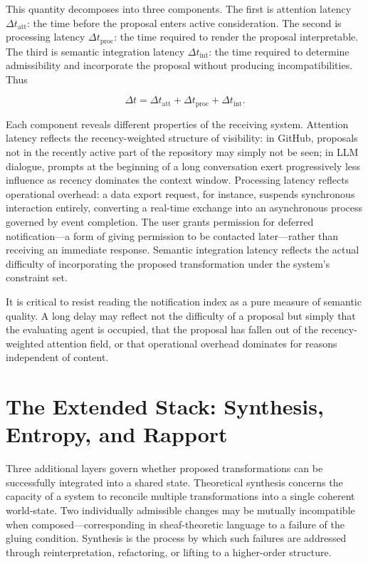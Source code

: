 \documentclass[12pt, letterpaper]{article}
\theoremstyle{flyxion}
\begin{document}
This quantity decomposes into three components. The first is attention latency $\Delta t_\mathrm{att}$: the time before the proposal enters active consideration. The second is processing latency $\Delta t_\mathrm{proc}$: the time required to render the proposal interpretable. The third is semantic integration latency $\Delta t_\mathrm{int}$: the time required to determine admissibility and incorporate the proposal without producing incompatibilities. Thus

\begin{equation}
\Delta t = \Delta t_\mathrm{att} + \Delta t_\mathrm{proc} + \Delta t_\mathrm{int}.
\end{equation}

Each component reveals different properties of the receiving system. Attention latency reflects the recency-weighted structure of visibility: in GitHub, proposals not in the recently active part of the repository may simply not be seen; in LLM dialogue, prompts at the beginning of a long conversation exert progressively less influence as recency dominates the context window. Processing latency reflects operational overhead: a data export request, for instance, suspends synchronous interaction entirely, converting a real-time exchange into an asynchronous process governed by event completion. The user grants permission for deferred notification---a form of giving permission to be contacted later---rather than receiving an immediate response. Semantic integration latency reflects the actual difficulty of incorporating the proposed transformation under the system's constraint set.

It is critical to resist reading the notification index as a pure measure of semantic quality. A long delay may reflect not the difficulty of a proposal but simply that the evaluating agent is occupied, that the proposal has fallen out of the recency-weighted attention field, or that operational overhead dominates for reasons independent of content.

\section{The Extended Stack: Synthesis, Entropy, and Rapport}

Three additional layers govern whether proposed transformations can be successfully integrated into a shared state. Theoretical synthesis concerns the capacity of a system to reconcile multiple transformations into a single coherent world-state. Two individually admissible changes may be mutually incompatible when composed---corresponding in sheaf-theoretic language to a failure of the gluing condition. Synthesis is the process by which such failures are addressed through reinterpretation, refactoring, or lifting to a higher-order structure.
\end{document}
